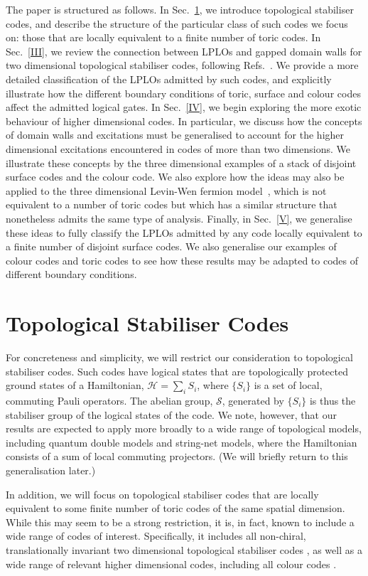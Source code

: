 \documentclass[pra,twocolumn,a4paper,nofootinbib]{revtex4-1}
\begin{document}
The paper is structured as follows. In Sec.~\ref{II}, we introduce topological stabiliser codes, and describe the structure of the particular class of such codes we focus on: those that are locally equivalent to a finite number of toric codes. In Sec.~\ref{III}, we review the connection between LPLOs and gapped domain walls for two dimensional topological stabiliser codes, following Refs.~\cite{YoshidaA,Beverland}. We provide a more detailed classification of the LPLOs admitted by such codes, and explicitly illustrate how the different boundary conditions of toric, surface and colour codes affect the admitted logical gates.  In Sec.~\ref{IV}, we begin exploring the more exotic behaviour of higher dimensional codes. In particular, we discuss how the concepts of domain walls and excitations must be generalised to account for the higher dimensional excitations encountered in codes of more than two dimensions. We illustrate these concepts by the three dimensional examples of a stack of disjoint surface codes and the colour code. We also explore how the ideas may also be applied to the three dimensional Levin-Wen fermion model~\cite{LW}, which is not equivalent to a number of toric codes but which has a similar structure that nonetheless admits the same type of analysis. Finally, in Sec.~\ref{V}, we generalise these ideas to fully classify the LPLOs admitted by any code locally equivalent to a finite number of disjoint surface codes. We also generalise our examples of colour codes and toric codes to see how these results may be adapted to codes of different boundary conditions.

\section{Topological Stabiliser Codes}
\label{II}
For concreteness and simplicity, we will restrict our consideration to topological stabiliser codes. Such codes have logical states that are topologically protected ground states of a Hamiltonian, $\mathcal{H}=\sum_{i} S_i$, where $\{S_i\}$ is a set of local, commuting Pauli operators. The abelian group, $\mathcal{S}$, generated by $\{S_i\}$ is thus the stabiliser group of the logical states of the code. We note, however, that our results are expected to apply more broadly to a wide range of topological models, including quantum double models and string-net models, where the Hamiltonian consists of a sum of local commuting projectors.  (We will briefly return to this generalisation later.)

In addition, we will focus on topological stabiliser codes that are locally equivalent to some finite number of toric codes of the same spatial dimension.  While this may seem to be a strong restriction, it is, in fact, known to include a wide range of codes of interest.  Specifically, it includes all non-chiral, translationally invariant two dimensional topological stabiliser codes \cite{BDcP}, as well as a wide range of relevant higher dimensional codes, including all colour codes \cite{Kubica}.
\end{document}
